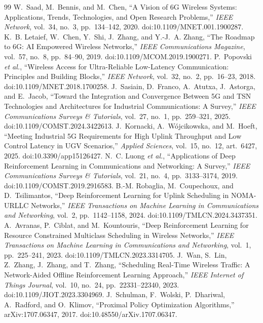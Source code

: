 \documentclass[number]{autarticle}
\begin{document}
\begin{thebibliography}{99}\small
{} W.~Saad, M.~Bennis, and M.~Chen, ``A Vision of 6G Wireless Systems: Applications, Trends, Technologies, and Open Research Problems,'' \emph{IEEE Network}, vol.~34, no.~3, pp.~134--142, 2020. doi:10.1109/MNET.001.1900287.
 K.~B. Letaief, W.~Chen, Y.~Shi, J.~Zhang, and Y.-J.~A. Zhang, ``The Roadmap to 6G: AI Empowered Wireless Networks,'' \emph{IEEE Communications Magazine}, vol.~57, no.~8, pp.~84--90, 2019. doi:10.1109/MCOM.2019.1900271.
 P.~Popovski \emph{et al.}, ``Wireless Access for Ultra-Reliable Low-Latency Communication: Principles and Building Blocks,'' \emph{IEEE Network}, vol.~32, no.~2, pp.~16--23, 2018. doi:10.1109/MNET.2018.1700258.
 J.~Sasiain, D.~Franco, A.~Atutxa, J.~Astorga, and E.~Jacob, ``Toward the Integration and Convergence Between 5G and TSN Technologies and Architectures for Industrial Communications: A Survey,'' \emph{IEEE Communications Surveys \& Tutorials}, vol.~27, no.~1, pp.~259--321, 2025. doi:10.1109/COMST.2024.3422613.
 J.~Kornacki, A.~Wójcikowska, and M.~Hoeft, ``Meeting Industrial 5G Requirements for High Uplink Throughput and Low Control Latency in UGV Scenarios,'' \emph{Applied Sciences}, vol.~15, no.~12, art.~6427, 2025. doi:10.3390/app15126427.
 N.~C. Luong \emph{et al.}, ``Applications of Deep Reinforcement Learning in Communications and Networking: A Survey,'' \emph{IEEE Communications Surveys \& Tutorials}, vol.~21, no.~4, pp.~3133--3174, 2019. doi:10.1109/COMST.2019.2916583.
 B.-M. Robaglia, M.~Coupechoux, and D.~Tsilimantos, ``Deep Reinforcement Learning for Uplink Scheduling in NOMA-URLLC Networks,'' \emph{IEEE Transactions on Machine Learning in Communications and Networking}, vol.~2, pp.~1142--1158, 2024. doi:10.1109/TMLCN.2024.3437351.
 A.~Avranas, P.~Ciblat, and M.~Kountouris, ``Deep Reinforcement Learning for Resource Constrained Multiclass Scheduling in Wireless Networks,'' \emph{IEEE Transactions on Machine Learning in Communications and Networking}, vol.~1, pp.~225--241, 2023. doi:10.1109/TMLCN.2023.3314705.
 J.~Wan, S.~Lin, Z.~Zhang, J.~Zhang, and T.~Zhang, ``Scheduling Real-Time Wireless Traffic: A Network-Aided Offline Reinforcement Learning Approach,'' \emph{IEEE Internet of Things Journal}, vol.~10, no.~24, pp.~22331--22340, 2023. doi:10.1109/JIOT.2023.3304969.
 J.~Schulman, F.~Wolski, P.~Dhariwal, A.~Radford, and O.~Klimov, ``Proximal Policy Optimization Algorithms,'' arXiv:1707.06347, 2017. doi:10.48550/arXiv.1707.06347.

\end{thebibliography}
\end{document}
